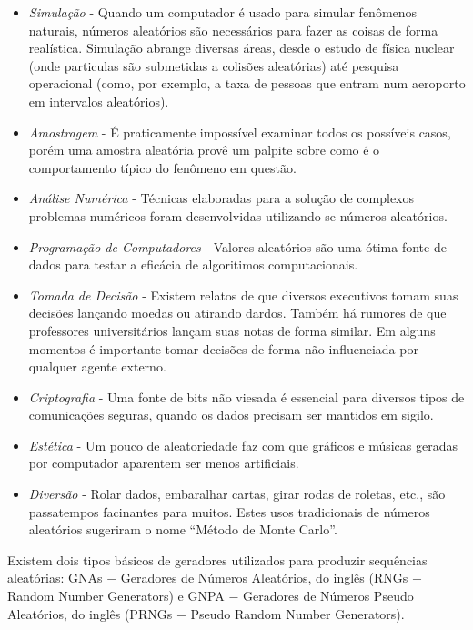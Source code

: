 \begin{itemize}
     \item \textit{Simulação} - Quando um computador é usado para simular fenômenos naturais, números aleatórios são necessários para fazer as coisas de forma realística. Simulação abrange diversas áreas, desde o estudo de física nuclear (onde particulas são submetidas a colisões aleatórias) até pesquisa operacional (como, por exemplo, a taxa de pessoas que entram num aeroporto em intervalos aleatórios).
     \item \textit{Amostragem} - É praticamente impossível examinar todos os possíveis casos, porém uma amostra aleatória provê um palpite sobre como é o comportamento típico do fenômeno em questão.
     \item \textit{Análise Numérica} - Técnicas elaboradas para a solução de complexos problemas numéricos foram desenvolvidas utilizando-se números aleatórios.
     \item \textit{Programação de Computadores} - Valores aleatórios são uma ótima fonte de dados para testar a eficácia de algoritimos computacionais.
     \item \textit{Tomada de Decisão} - Existem relatos de que diversos executivos tomam suas decisões lançando moedas ou atirando dardos. Também há rumores de que professores universitários lançam suas notas de forma similar. Em alguns momentos é importante tomar decisões de forma não influenciada por qualquer agente externo.
     \item \textit{Criptografia} - Uma fonte de bits não viesada é essencial para diversos tipos de comunicações seguras, quando os dados precisam ser mantidos em sigilo.
     \item \textit{Estética} - Um pouco de aleatoriedade faz com que gráficos e músicas geradas por computador aparentem ser menos artificiais.
     \item \textit{Diversão} - Rolar dados, embaralhar cartas, girar rodas de roletas, etc., são passatempos facinantes para muitos. Estes usos tradicionais de números aleatórios sugeriram o nome ``Método de Monte Carlo''.
    \end{itemize}
Existem dois tipos básicos de geradores utilizados para produzir sequências aleatórias: GNAs $-$ Geradores de Números Aleatórios, do inglês (RNGs $-$ Random Number Generators) e GNPA $-$ Geradores de Números Pseudo Aleatórios, do inglês (PRNGs $-$ Pseudo Random Number Generators).

